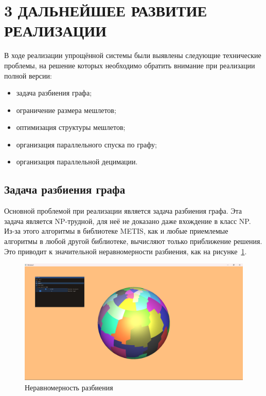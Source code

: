 \clearpage
\section{3 ДАЛЬНЕЙШЕЕ РАЗВИТИЕ РЕАЛИЗАЦИИ}
В ходе реализации упрощённой системы были выявлены следующие технические проблемы, на решение которых необходимо обратить внимание при реализации полной версии:
\begin{itemize}
    \item задача разбиения графа;
    \item ограничение размера мешлетов;
    \item оптимизация структуры мешлетов;
    \item организация параллельного спуска по графу;
    \item организация параллельной децимации.
\end{itemize}

\subsection*{Задача разбиения графа}
Основной проблемой при реализации является задача разбиения графа.
Эта задача является NP-трудной, для неё не доказано даже вхождение в класс NP.
Из-за этого алгоритмы в библиотеке METIS, как и любые приемлемые алгоритмы в любой другой библиотеке, вычисляют только приближение решения.
Это приводит к значительной неравномерности разбиения, как на рисунке~\ref{fig:sphere-0}.
\begin{figure}[ht]
    \centering
    \includegraphics[width=\textwidth]{pics/sphere0.png}
    \caption{Неравномерность разбиения}
    \label{fig:sphere-0}
\end{figure}

